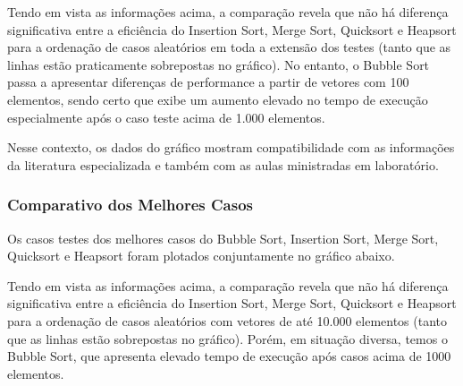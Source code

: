 \documentclass[a4paper, 12pt]{article}
\begin{document}
\vspace{0.8cm}
Tendo em vista as informações acima, a comparação revela que não há diferença significativa entre a eficiência do Insertion Sort, Merge Sort, Quicksort e Heapsort para a ordenação de casos aleatórios em toda a extensão dos testes (tanto que as linhas estão praticamente sobrepostas no gráfico). No entanto, o Bubble Sort passa a apresentar diferenças de performance a partir de vetores com 100 elementos, sendo certo que exibe um aumento elevado no tempo de execução especialmente após o caso teste acima de 1.000 elementos.

Nesse contexto, os dados do gráfico mostram compatibilidade com as informações da literatura especializada e também com as aulas ministradas em laboratório.


\subsubsection{Comparativo dos Melhores Casos}

\tab{ }Os casos testes dos melhores casos do Bubble Sort, Insertion Sort, Merge Sort, Quicksort e Heapsort foram plotados conjuntamente no gráfico abaixo.
\begin{center}
\end{center}


\vspace{0.8cm}
Tendo em vista as informações acima, a comparação revela que não há diferença significativa entre a eficiência do Insertion Sort, Merge Sort, Quicksort e Heapsort para a ordenação de casos aleatórios com vetores de até 10.000 elementos (tanto que as linhas estão sobrepostas no gráfico). Porém, em situação diversa, temos o Bubble Sort, que apresenta elevado tempo de execução após casos acima de 1000 elementos.
\end{document}
